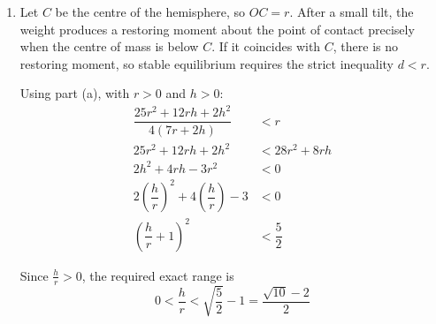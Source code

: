 \documentclass[leqno]{article}
\begin{document}
\begin{enumerate}[
  label=\textbf{\arabic*.},
  leftmargin=*,
  topsep=0pt,
  partopsep=0pt,
  parsep=0pt
]
\begin{djsSolution}
\begin{enumerate}[label=\textbf{(\alph*)}, start=1]
For a composite solid, the centre of mass satisfies
\[
M\bar{x}=\sum m_ix_i
\]

where \(M=\sum m_i\) is the total mass. Here \(\bar{x}=d\).

Substituting and cancelling the common factor \(\rho\pi r^2\):
\begin{align*}
\left(\dfrac{2r}{3}+\dfrac r2+\dfrac h3\right)d
&=\dfrac{2r}{3}\times\dfrac{5r}{8}
+\dfrac r2\times\dfrac{5r}{4}
+\dfrac h3\left(\dfrac{3r}{2}+\dfrac h4\right)\\
\dfrac{7r+2h}{6}\,d
&=\dfrac{5r^2}{12}+\dfrac{5r^2}{8}+\dfrac{rh}{2}+\dfrac{h^2}{12}\\
&=\dfrac{25r^2+12rh+2h^2}{24}\\
d&=\dfrac{25r^2+12rh+2h^2}{4(7r+2h)}
\end{align*}

\item Let \(C\) be the centre of the hemisphere, so \(OC=r\). After a small tilt, the weight produces a restoring moment about the point of contact precisely when the centre of mass is below \(C\). If it coincides with \(C\), there is no restoring moment, so stable equilibrium requires the strict inequality \(d<r\).

Using part (a), with \(r>0\) and \(h>0\):
\begin{align*}
\dfrac{25r^2+12rh+2h^2}{4(7r+2h)}&<r\\
25r^2+12rh+2h^2&<28r^2+8rh\\
2h^2+4rh-3r^2&<0\\
2\left(\dfrac hr\right)^2+4\left(\dfrac hr\right)-3&<0\\
\left(\dfrac hr+1\right)^2&<\dfrac52
\end{align*}

Since \(\frac hr>0\), the required exact range is
\[
0<\dfrac hr<\sqrt{\dfrac52}-1=\dfrac{\sqrt{10}-2}{2}
\]

\end{enumerate}
\end{djsSolution}

\end{enumerate}
\end{document}
